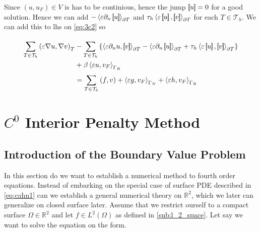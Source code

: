 

Since $\left( u, u_{F} \right) \in V $ is has to be continious, hence the jump $\left[\!\!\left[ u \right]\!\!\right] = 0$ for a good solution. Hence
we can add $-\left<\varepsilon \partial _{n} \left[\!\!\left[ u \right]\!\!\right] \right>_{\partial T}$ and $ \tau _{h} \left<\varepsilon \jump{u},
\jump{v} \right>_{\partial T}$ for each $T \in  \mathcal{T}_{h} $. We can add this to lhs on \eqref{eq:3c2} so



\begin{equation}
\label{eq:3c}
\begin{split}
    \sum_{T \in \mathcal{T} _{h}}^{}   \left( \varepsilon \nabla u, \nabla v \right) _{T} &-\sum_{T \in \mathcal{T} _{h}}^{}
\left\{ \left<\varepsilon  \partial
_{n} u , \jump{ v } \right> _{\partial T}  -\left<\varepsilon
\partial _{n} \jump{u} \right>_{\partial T}  + \tau _{h} \left<\varepsilon \jump{u},
\jump{v} \right>_{\partial T} \right\}  \\ &+ \beta  \left< \varepsilon u, v_{F}  \right>_{\Gamma _{R}} \\
                                           &= \sum_{T
\in \mathcal{T} _{h}}^{} \left( f,v \right)  + \left<\varepsilon g, v_{F} \right>_{\Gamma _{N}} + \left<\varepsilon h,
v_{F} \right>_{\Gamma _{R}}
\end{split}
\end{equation}









\section{$C^0$ Interior Penalty Method}
\label{sec:ch1}

\subsection{Introduction of the Boundary Value Problem}%
\label{sub:introduction_of_the_bvp}


In this section do we want to establish a numerical method to fourth order equations. Instead of embarking on the
special case of surface PDE described in \eqref{eq:cahn1} can we establish a general numerical theory on $\mathbb{R} ^2$, which we later can generalize on closed surface later. Assume that we restrict ourself to a compact surface $\Omega \in \mathbb{R} ^2 $ and let $f \in L^{2}\left( \Omega
\right) $ as defined in \ref{sub:l_2_space}.
Let say we want to solve the equation on the form.

